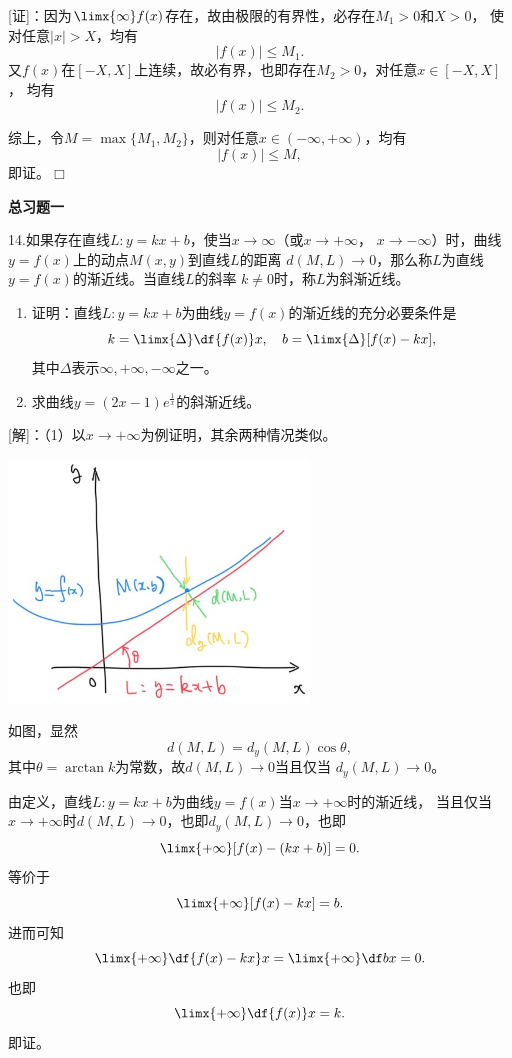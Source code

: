 [证]：因为$\limx{\infty}f(x)$存在，故由极限的有界性，必存在$M_1>0$和$X>0$，
使对任意$|x|>X$，均有
$$|f(x)|\leq M_1.$$
又$f(x)$在$[-X,X]$上连续，故必有界，也即存在$M_2>0$，对任意$x\in[-X,X]$，
均有
$$|f(x)|\leq M_2.$$

综上，令$M=\max\{M_1,M_2\}$，则对任意$x\in(-\infty,+\infty)$，均有
$$|f(x)|\leq M,$$
即证。\hfill$\Box$

\begin{center}
	\bf 总习题一
\end{center}

\bigskip

14.如果存在直线$L:y=kx+b$，使当$x\to\infty$（或$x\to+\infty$，
$x\to-\infty$）时，曲线$y=f(x)$上的动点$M(x,y)$到直线$L$的距离
$d(M,L)\to 0$，那么称$L$为直线$y=f(x)$的渐近线。当直线$L$的斜率
$k\ne 0$时，称$L$为斜渐近线。
\begin{enumerate}[(1)]
  \setlength{\itemindent}{1cm}
  \item 证明：直线$L:y=kx+b$为曲线$y=f(x)$的渐近线的充分必要条件是
  $$k=\limx{\Delta}\df{f(x)}x,\quad
  b=\limx{\Delta}[f(x)-kx],$$
  其中$\Delta$表示$\infty,+\infty,-\infty$之一。
  \item 求曲线$y=(2x-1)e^{\frac1x}$的斜渐近线。
\end{enumerate}

[解]：（1）以$x\to+\infty$为例证明，其余两种情况类似。

\begin{center}
	\includegraphics[width=8cm]{./images/ch1/kxb.jpg}
\end{center}

如图，显然
$$d(M,L)=d_y(M,L)\cos\theta,$$
其中$\theta=\arctan k$为常数，故$d(M,L)\to 0$当且仅当
$d_y(M,L)\to 0$。

由定义，直线$L:y=kx+b$为曲线$y=f(x)$当$x\to+\infty$时的渐近线，
当且仅当$x\to+\infty$时$d(M,L)\to 0$，也即$d_y(M,L)\to 0$，也即
$$\limx{+\infty}[f(x)-(kx+b)]=0.$$
等价于
$$\limx{+\infty}[f(x)-kx]=b.$$
进而可知
$$\limx{+\infty}\df{f(x)-kx}x=\limx{+\infty}\df bx=0.$$
也即
$$\limx{+\infty}\df{f(x)}x=k.$$
即证。

